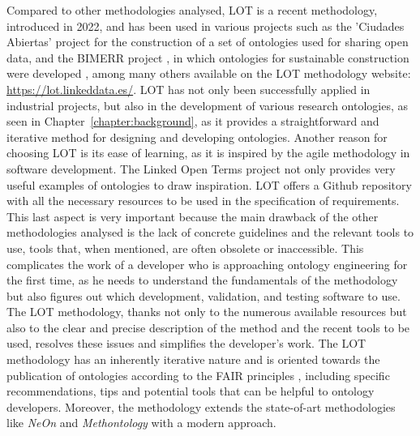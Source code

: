Compared to other methodologies analysed, LOT is a recent methodology, introduced in 2022, and has been used in various projects such as the 'Ciudades Abiertas' project \cite{ciudad} for the construction of a set of ontologies used for sharing open data, and the BIMERR project \cite{bimerr}, in which ontologies for sustainable construction were developed \cite{bountouni2021bimerr}, among many others available on the LOT methodology website: \href{https://lot.linkeddata.es/}{https://lot.linkeddata.es/}.
LOT has not only been successfully applied in industrial projects, but also in the development of various research ontologies, as seen in Chapter~\ref{chapter:background}, as it provides a straightforward and iterative method for designing and developing ontologies.
Another reason for choosing LOT is its ease of learning, as it is inspired by the agile methodology in software development. The Linked Open Terms project not only provides very useful examples of ontologies to draw inspiration. LOT offers a Github repository \cite{lot_github} with all the necessary resources to be used in the specification of requirements.
This last aspect is very important because the main drawback of the other methodologies analysed is the lack of concrete guidelines and the relevant tools to use, tools that, when mentioned, are often obsolete or inaccessible.
This complicates the work of a developer who is approaching ontology engineering for the first time, as he needs to understand the fundamentals of the methodology but also figures out which development, validation, and testing software to use.
The LOT methodology, thanks not only to the numerous available resources but also to the clear and precise description of the method and the recent tools to be used, resolves these issues and simplifies the developer's work.
The LOT methodology has an inherently iterative nature and is oriented towards the publication of ontologies according to the FAIR principles \cite{fair_eu}, including specific recommendations, tips and potential
tools that can be helpful to ontology developers.
Moreover, the methodology extends the state-of-art methodologies like \textit{NeOn} and \textit{Methontology} with a modern approach.

